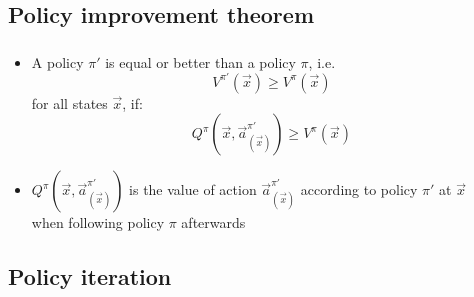 \subsection{Policy improvement theorem}

\begin{frame}[label=policy_improvement] \frametitle{\subsecname}
	\begin{itemize}
		\item A policy $\pi'$ is equal or better than a policy $\pi$, i.e.
			\begin{equation*}
				V^{\pi'}(\vec x) \geq V^\pi(\vec x)
			\end{equation*}
			for all states $\vec x$, if:
			\begin{equation*}
				Q^\pi \left(\vec x, \vec a^{\pi'}_{(\vec x)} \right) \geq V^\pi(\vec x)
			\end{equation*}
		\vspace{2mm}		
		\item $Q^\pi \left(\vec x, \vec a^{\pi'}_{(\vec x)} \right)$ is the value of action $\vec a^{\pi'}_{(\vec x)}$ according to policy $\pi'$ at $\vec x$\\[3pt] when following policy $\pi$ afterwards
	\end{itemize}
	
\end{frame}

\subsection{Policy iteration}

